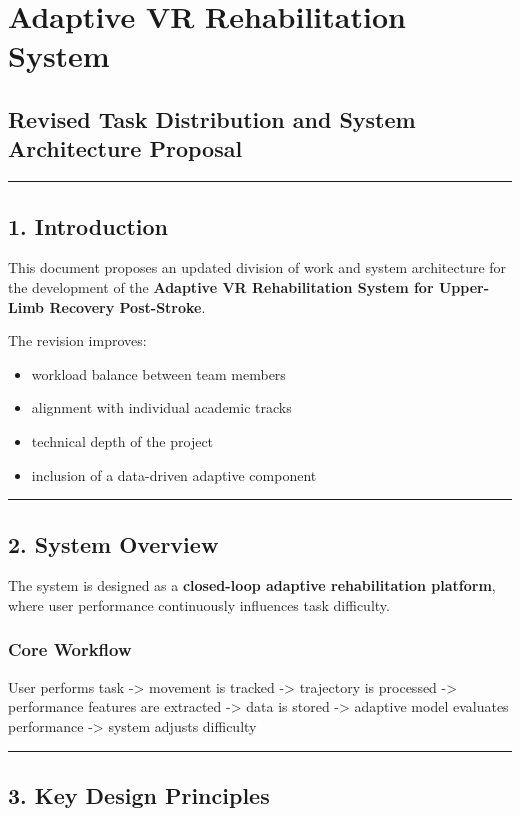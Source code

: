 \documentclass[11pt]{article}
\begin{document}
\section*{Adaptive VR Rehabilitation System}

\subsection*{Revised Task Distribution and System Architecture Proposal}


\hrule


\subsection*{1. Introduction}


This document proposes an updated division of work and system architecture for the development of the \textbf{Adaptive VR Rehabilitation System for Upper-Limb Recovery Post-Stroke}.


The revision improves:

\begin{itemize}
\item workload balance between team members
\item alignment with individual academic tracks
\item technical depth of the project
\item inclusion of a data-driven adaptive component
\end{itemize}

\hrule


\subsection*{2. System Overview}


The system is designed as a \textbf{closed-loop adaptive rehabilitation platform}, where user performance continuously influences task difficulty.


\subsubsection*{Core Workflow}


User performs task -> movement is tracked -> trajectory is processed -> performance features are extracted -> data is stored -> adaptive model evaluates performance -> system adjusts difficulty


\hrule


\subsection*{3. Key Design Principles}
\end{document}
